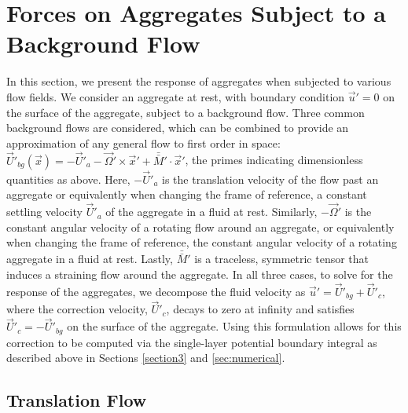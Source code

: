 \section{Forces on Aggregates Subject to a Background Flow} 
\label{sec:results}
In this section, we present the response of aggregates when subjected to various flow fields. We consider an aggregate at rest, with boundary condition $\vec{u}'=0$ on the surface of the aggregate, subject to a background flow. Three common background flows are considered, which can be combined to provide an approximation of any general flow to first order in space: $\vec{U}'_{bg}(\vec{x}) = -\vec{U}'_a - \vec{\Omega}' \times \vec{x}' + \bar{\bar{M}}' \cdot \vec{x}'$, the primes indicating dimensionless quantities as above. Here, $-\vec{U}'_a$ is the translation velocity of the flow past an aggregate or equivalently when changing the frame of reference, a constant settling velocity $\vec{U}'_a$ of the aggregate in a fluid at rest.  Similarly, $-\vec{\Omega}'$ is the constant angular velocity of a rotating flow around an aggregate, or equivalently when changing the frame of reference, the constant angular velocity of a rotating aggregate in a fluid at rest. Lastly, $\bar{\bar{M}}'$ is a traceless, symmetric tensor that induces a straining flow around the aggregate. In all three cases, to solve for the response of the aggregates, we decompose the fluid velocity as $\vec{u}' = \vec{U}'_{bg} + \vec{U}'_c$, where the correction velocity, $\vec{U}'_c$, decays to zero at infinity and satisfies $\vec{U}'_c = -\vec{U}'_{bg}$ on the surface of the aggregate. 
Using this formulation allows for this correction to be computed via the single-layer potential boundary integral as described above in Sections \ref{section3} and \ref{sec:numerical}.
\subsection{Translation Flow}
\label{sec:results_translationflow}

